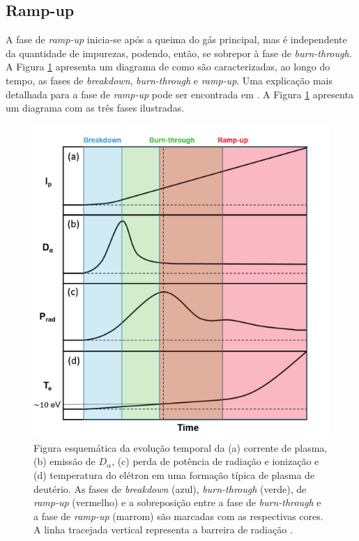 \documentclass[12pt,oneside,a4paper]{abntex2}
\begin{document}
\subsection{Ramp-up}
\label{ramp-up}
\noindent A fase de \textit{ramp-up} inicia-se após a queima do gás principal, mas é independente da quantidade de impurezas, podendo, então, se sobrepor à fase de \textit{burn-through}. A Figura \ref{fig: tokamakphases} apresenta um diagrama de como são caracterizadas, ao longo do tempo, as fases de \textit{breakdown}, \textit{burn-through} e \textit{ramp-up}.  Uma explicação mais detalhada para a fase de \textit{ramp-up} pode ser encontrada em \cite[pg. 49]{piras2011extremely}. A Figura \ref{fig: tokamakphases} apresenta um diagrama com as três fases ilustradas.

\begin{figure}[H]
\centering
\includegraphics[scale=0.4]{tabela3fases.png}  
\caption{Figura esquemática da evolução temporal da (a) corrente de plasma, (b) emissão de $D_\alpha$, (c) perda de potência de radiação e ionização e (d) temperatura do elétron em uma formação típica de plasma de deutério. As fases de \textit{breakdown} (azul), \textit{burn-through} (verde), de \textit{ramp-up} (vermelho) e a sobreposição entre a fase de \textit{burn-through} e a fase de \textit{ramp-up} (marrom) são marcadas com as respectivas cores. A linha tracejada vertical representa a barreira de radiação \cite{sinha2017plasma}.}    
\label{fig: tokamakphases}
\end{figure}
\end{document}
